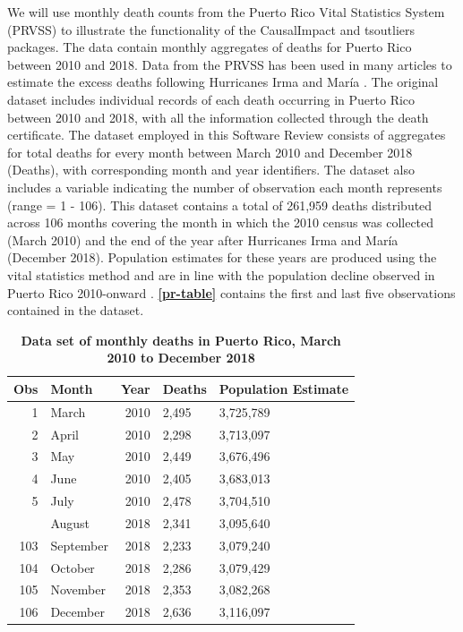 \documentclass[12pt]{article}
\begin{document}
We will use monthly death counts from the Puerto Rico Vital Statistics
System (PRVSS) to illustrate the functionality of the
\textsf{CausalImpact} and \textsf{tsoutliers} packages. The data contain
monthly aggregates of deaths for Puerto Rico between 2010 and 2018. Data
from the PRVSS has been used in many articles to estimate the excess
deaths following Hurricanes Irma and María
\citep{rivera_estimating_2018, sandberg2019all, santos2018use, SANTOSBURGOA2018e478, CruzCano}.
The original dataset includes individual records of each death occurring
in Puerto Rico between 2010 and 2018, with all the information collected
through the death certificate. The dataset employed in this Software
Review consists of aggregates for total deaths for every month between
March 2010 and December 2018 (Deaths), with corresponding month and year
identifiers. The dataset also includes a variable indicating the number
of observation each month represents (range = 1 - 106). This dataset
contains a total of 261,959 deaths distributed across 106 months
covering the month in which the 2010 census was collected (March 2010)
and the end of the year after Hurricanes Irma and María (December 2018).
Population estimates for these years are produced using the vital
statistics method and are in line with the population decline observed
in Puerto Rico 2010-onward \citep{santoslozada_puerto_2020}.
\textbf{\autoref{pr-table}} contains the first and last five
observations contained in the dataset.

\begin{longtable}[t]{rlrll}
\caption{\label{tab:unnamed-chunk-3}\textbf{Data set of monthly deaths in Puerto Rico, March 2010 to December 2018} \label{pr-table}}\\
\toprule
Obs & Month & Year & Deaths & Population Estimate\\
\midrule
1 & March & 2010 & 2,495 & 3,725,789\\
2 & April & 2010 & 2,298 & 3,713,097\\
3 & May & 2010 & 2,449 & 3,676,496\\
4 & June & 2010 & 2,405 & 3,683,013\\
5 & July & 2010 & 2,478 & 3,704,510\\
\addlinespace
102 & August & 2018 & 2,341 & 3,095,640\\
103 & September & 2018 & 2,233 & 3,079,240\\
104 & October & 2018 & 2,286 & 3,079,429\\
105 & November & 2018 & 2,353 & 3,082,268\\
106 & December & 2018 & 2,636 & 3,116,097\\
\bottomrule
\end{longtable}
\end{document}
